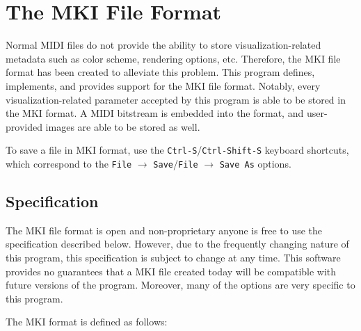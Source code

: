 \documentclass[english]{article}
\providecommand{\mi}[1]{\texttt{#1}}
\begin{document}
\newpage

\section{The MKI File Format}

Normal MIDI files do not provide the ability to store visualization-related metadata such as color scheme,
rendering options, etc. Therefore, the MKI file format has been created to alleviate this problem.
This program defines, implements, and provides support for the MKI file format. Notably, every visualization-related
parameter accepted by this program is able to be stored in the MKI format. A MIDI bitstream is embedded into the format,
and user-provided images are able to be stored as well.

To save a file in MKI format, use the \mi{Ctrl-S}/\mi{Ctrl-Shift-S} keyboard shortcuts, which correspond to the 
\mi{File} $\rightarrow$ \mi{Save}/\mi{File} $\rightarrow$ \mi{Save As}
options.

\subsection{Specification}

The MKI file format is open and non-proprietary \textendash{} anyone is free to use the specification described below. However,
due to the frequently changing nature of this program, this specification is subject to change at any time. This software
provides no guarantees that a MKI file created today will be compatible with future versions of the program. Moreover,
many of the options are very specific to this program.

The MKI format is defined as follows:

\vspace{1em}
\end{document}
